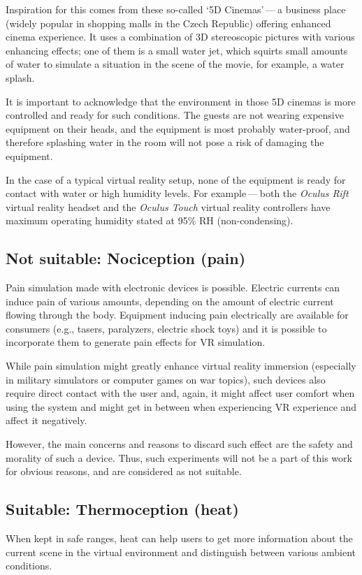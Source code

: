 Inspiration for this comes from these so-called `5D Cinemas' — a business
place (widely popular in shopping malls in the Czech Republic) offering
enhanced cinema experience. It uses a combination of 3D stereoscopic
pictures with various enhancing effects; one of them is a small water jet, 
which squirts small amounts of water to simulate a
situation in the scene of the movie, for example, a water splash. \cite{5dcin}


It is important to acknowledge that the environment in those 5D cinemas
is more controlled and ready for such conditions. The guests are not
wearing expensive equipment on their heads, and the equipment is
most probably water-proof, and therefore splashing water in the room will not
pose a risk of damaging the equipment.


In the case of a typical virtual reality setup, none of the equipment is ready
for contact with water or high humidity levels. For example — both the
\emph{Oculus Rift} virtual reality headset and the \emph{Oculus Touch} virtual reality
controllers have maximum operating humidity stated at 95\% RH (non-condensing). 
\cite{orhswg}


\hypertarget{x-not-suitable:-nociception-(pain)}{\subsection{Not suitable: Nociception (pain)}}
Pain simulation made with electronic devices is possible. Electric currents can
induce pain of various amounts, depending on the amount of electric current
flowing through the body.
Equipment inducing pain electrically are available for consumers
(e.g., tasers, paralyzers, electric shock toys) and it is possible to
incorporate them to generate pain effects for VR simulation.


While pain simulation might greatly enhance virtual reality immersion
(especially in military simulators or computer games on war topics),
such devices also require direct contact with the user and, again,
it might affect user comfort when using the system and might get in between
when experiencing VR experience and affect it negatively.


However, the main concerns and reasons to discard such effect are the
safety and morality of such a device. Thus, such experiments will not be
a part of this work for obvious reasons, and are considered as not suitable.


\hypertarget{x-suitable:-thermoception-(heat)}{\subsection{Suitable: Thermoception (heat)}}
When kept in safe ranges, heat can help users to get more information about the
current scene in the virtual environment and distinguish between 
various ambient conditions.

